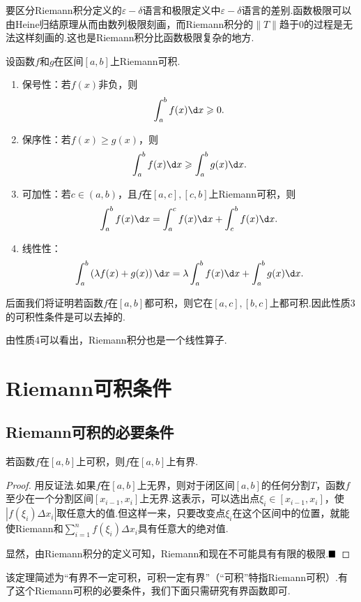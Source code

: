 \begin{remark}
	要区分Riemann积分定义的$\varepsilon-\delta$语言和极限定义中$\varepsilon-\delta$语言的差别.函数极限可以由Heine归结原理从而由数列极限刻画，而Riemann积分的$\|T\|$趋于$0$的过程是无法这样刻画的.这也是Riemann积分比函数极限复杂的地方.
\end{remark}
\begin{proposition}[Riemann积分的简单性质]
	设函数$f$和$g$在区间$\left[a,b\right]$上Riemann可积.
	\begin{enumerate}
		\item 保号性：若$f(x)$非负，则
		$$\int_{a}^{b}f(x)\d x\geqslant0.$$
		\item 保序性：若$f(x)\geqslant g(x)$，则
		$$\int_{a}^{b}f(x)\d x\geqslant\int_{a}^{b}g(x)\d x.$$
		\item 可加性：若$c\in(a,b)$，且$f$在$\left[a,c\right],\left[c,b\right]$上Riemann可积，则
		$$\int_{a}^{b}f(x)\d x=\int_{a}^{c}f(x)\d x+\int_{c}^{b}f(x)\d x.$$
		\item 线性性：
		$$\int_{a}^{b}\left(\lambda f(x)+g(x)\right)\d x=\lambda\int_{a}^{b}f(x)\d x+\int_{a}^{b}g(x)\d x.$$
	\end{enumerate}
\end{proposition}
\begin{remark}
	后面我们将证明若函数$f$在$\left[a,b\right]$都可积，则它在$\left[a,c\right],\left[b,c\right]$上都可积.因此性质3的可积性条件是可以去掉的.
\end{remark}
\begin{remark}
	由性质4可以看出，Riemann积分也是一个线性算子.
\end{remark}
\section{Riemann可积条件}
\subsection{Riemann可积的必要条件}
\begin{theorem}
	若函数$f$在$\left[a,b\right]$上可积，则$f$在$\left[a,b\right]$上有界.
\end{theorem}
\begin{proof}
	用反证法.如果$f$在$\left[a,b\right]$上无界，则对于闭区间$\left[a,b\right]$的任何分割$T$，函数$f$至少在一个分割区间$\left[x_{i-1},x_i\right]$上无界.这表示，可以选出点$\xi_i\in\left[x_{i-1},x_i\right]$，使$|f(\xi_i)\Delta x_i|$取任意大的值.但这样一来，只要改变点$\xi_i$在这个区间中的位置，就能使Riemann和$\displaystyle\sum_{i=1}^{n}f(\xi_i)\Delta x_i$具有任意大的绝对值.
	
	显然，由Riemann积分的定义可知，Riemann和现在不可能具有有限的极限.$\hfill\blacksquare$
\end{proof}
\begin{remark}
	该定理简述为“有界不一定可积，可积一定有界”（“可积”特指Riemann可积）.有了这个Riemann可积的必要条件，我们下面只需研究有界函数即可.
\end{remark}
